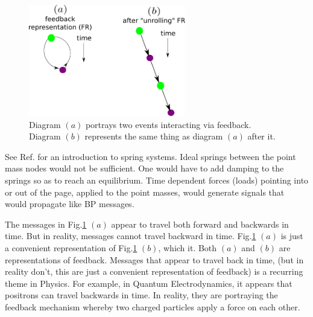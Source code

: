 \begin{figure}[h!]
\centering
\includegraphics[width=2.7in]
{mpass/time-travel.png}
\caption{Diagram $(a)$ portrays two events interacting via feedback. Diagram $(b)$
represents the same thing as diagram $(a)$
after  it.}
\label{fig-time-travel}
\end{figure}

See Ref.\cite{wiki-spring-net}
for an introduction to spring systems.
Ideal springs between the point mass
nodes would
not be sufficient.
One would have to add damping to
the springs so as
to reach an equilibrium.
Time dependent forces (loads)
pointing into or out of the page, applied
to the point masses, would
generate signals that would
propagate
like BP messages.


The messages in Fig.\ref{fig-time-travel} $(a)$ 
appear to travel both forward and backwards in time.
But in reality, messages cannot travel backward in time.  Fig.\ref{fig-time-travel} $(a)$
is just a convenient representation of 
Fig.\ref{fig-time-travel} $(b)$, which  it. Both $(a)$ and $
(b)$ are representations of feedback.
Messages that appear to travel back in time,
(but in reality don't, this are just a convenient 
representation of feedback) 
is a recurring theme in Physics. For example,
in Quantum Electrodynamics, it appears that positrons can travel backwards in time.  In reality,
they are portraying the feedback mechanism whereby two
charged
particles
apply a force on each other.



